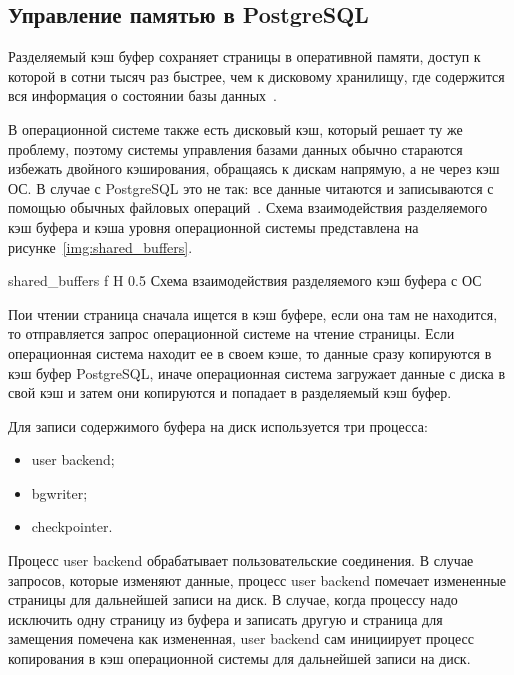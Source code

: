 \subsection{Управление памятью в PostgreSQL}

Разделяемый кэш буфер сохраняет страницы в оперативной памяти, доступ к которой в сотни тысяч раз быстрее, чем к дисковому хранилищу, где содержится вся информация о состоянии базы данных~\cite{shaik2020postgresql}.

В операционной системе также есть дисковый кэш, который решает ту же проблему, поэтому системы управления базами данных обычно стараются избежать двойного кэширования, обращаясь к дискам напрямую, а не через кэш ОС. 
В случае с PostgreSQL это не так: все данные читаются и записываются с помощью обычных файловых операций~\cite{rogov2023postgresql}.
Схема взаимодействия разделяемого кэш буфера и кэша уровня операционной системы представлена на рисунке~\ref{img:shared_buffers}.

{shared_buffers} %
{f} %
{H} %
{0.5\textwidth} %
{Схема взаимодействия разделяемого кэш буфера с ОС} %

Пои чтении страница сначала ищется в кэш буфере, если она там не находится, то отправляется запрос операционной системе на чтение страницы.
Если операционная система находит ее в своем кэше, то данные сразу копируются в кэш буфер PostgreSQL, иначе операционная система загружает данные с диска в свой кэш и затем они копируются и попадает в разделяемый кэш буфер.

Для записи содержимого буфера на диск используется три процесса:
\begin{itemize}
	\item user backend;
	\item bgwriter;
	\item checkpointer.
\end{itemize}

Процесс user backend обрабатывает пользовательские соединения.
В случае запросов, которые изменяют данные, процесс user backend помечает измененные страницы для дальнейшей записи на диск.
В случае, когда процессу надо исключить одну страницу из буфера и записать другую и страница для замещения помечена как измененная, user backend сам инициирует процесс копирования в кэш операционной системы для дальнейшей записи на диск.

